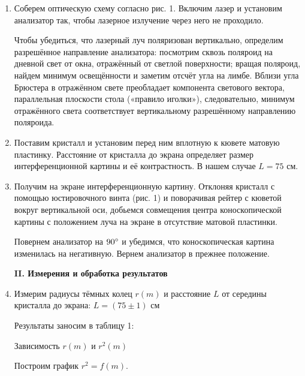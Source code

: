 \documentclass[12pt,a4paper]{article}
\begin{document}
	\begin{enumerate}
		\item Соберем оптическую схему согласно рис. 1. Включим лазер и установим анализатор так, чтобы лазерное излучение через него не проходило. 
		
		Чтобы убедиться, что лазерный луч поляризован вертикально, определим разрешённое направление анализатора: посмотрим сквозь поляроид на дневной свет от окна, отражённый от светлой поверхности; вращая поляроид, найдем минимум освещённости и заметим отсчёт угла на лимбе. Вблизи угла Брюстера в отражённом свете преобладает компонента светового вектора, параллельная плоскости стола («правило иголки»), следовательно, минимум отражённого света соответствует вертикальному разрешённому направлению поляроида.
		
		
		\item Поставим кристалл и установим перед ним вплотную к кювете матовую пластинку. Расстояние от кристалла до экрана определяет размер интерференционной картины и её контрастность. В нашем случае $L = 75$ см.
		
		\item Получим на экране интерференционную картину. Отклоняя кристалл с помощью юстировочного винта (рис. 1) и поворачивая рейтер с кюветой вокруг вертикальной оси, добьемся совмещения центра коноскопической картины с положением луча на экране в отсутствие матовой пластинки.
	
		Повернем анализатор на $90\degree$ и убедимся, что коноскопическая картина изменилась на негативную. Вернем анализатор в прежнее положение.

		\begin{center}
			\textbf{II. Измерения и обработка результатов}
		\end{center}
	
		\item Измерим радиусы тёмных колец $r(m)$ и расстояние $L$ от середины кристалла до экрана: $\boxed{L = (75 \pm 1) \text{ см}}$
		
		Результаты заносим в таблицу 1:
        \begin{table}[H]
    	   \centering
    	   \footnotesize
    	   
    	   \caption{Зависимость $r(m)$ и $r^2(m)$}
    	   \label{tab:t1}
        \end{table}	
	
		
		Построим график $r^2 = f(m)$.
		

\end{enumerate}
\end{document}
